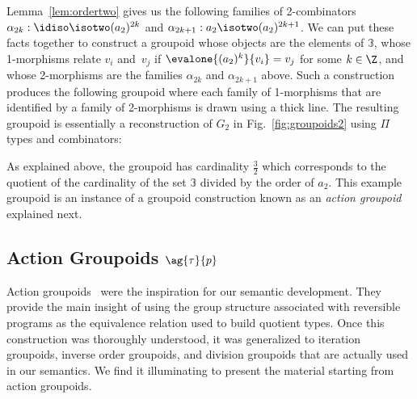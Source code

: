 Lemma~\ref{lem:ordertwo} gives us the following families of 2-combinators
$\alpha_{2k} : \idiso \isotwo (a_2)^{2k}$ and
$\alpha_{2k+1} : a_2 \isotwo (a_2)^{2k+1}$. We can put these facts together to
construct a groupoid whose objects are the elements of $\mathbb{3}$, whose
1-morphisms relate $v_i$ and~$v_j$ if $\evalone{(a_2)^k}{v_i} = v_j$ for some
$k \in \Z$, and whose 2-morphisms are the families $\alpha_{2k}$ and
$\alpha_{2k+1}$ above. Such a construction produces the following groupoid where
each family of 1-morphisms that are identified by a family of 2-morphisms is
drawn using a thick line. The resulting groupoid is essentially a reconstruction
of $G_2$ in Fig.~\ref{fig:groupoids2} using $\Pi$ types and combinators:

\begin{center}
\end{center}

As explained above, the groupoid has cardinality $\frac{3}{2}$ which corresponds
to the quotient of the cardinality of the set $\mathbb{3}$ divided by the order
of $a_2$. This example groupoid is an instance of a groupoid construction known
as an \emph{action groupoid} explained next.

\subsection{Action Groupoids $\ag{\tau}{p}$}

Action groupoids~\cite{groupoidintro} were the inspiration for our
semantic development. They provide the main insight of using the
group structure associated with reversible programs as the equivalence
relation used to build quotient types. Once this construction was
thoroughly understood, it was generalized to iteration groupoids,
inverse order groupoids, and division groupoids that are actually used
in our semantics. We find it illuminating to present the material
starting from action groupoids.

